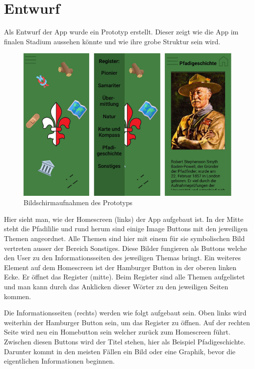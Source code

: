 \section{Entwurf}
Als Entwurf der App wurde ein Prototyp erstellt. Dieser zeigt wie die App im finalen Stadium aussehen könnte und wie ihre grobe Struktur sein wird.
\begin{figure}[h]
    \centering
    \includegraphics[width=\linewidth]{Picture/homescreen.png}
    \caption{Bildschirmaufnahmen des Prototyps}
\end{figure}
Hier sieht man, wie der Homescreen (links) der App aufgebaut ist. In der Mitte steht die Pfadililie und rund herum sind einige Image Buttons mit den jeweiligen Themen angeordnet. Alle Themen sind hier mit einem für sie symbolischen Bild vertreten ausser der Bereich Sonstiges. Diese Bilder fungieren als Buttons welche den User zu den Informationsseiten des jeweiligen Themas bringt. Ein weiteres Element auf dem Homescreen ist der Hamburger Button in der oberen linken Ecke. Er öffnet das Register (mitte). Beim Register sind alle Themen aufgelistet und man kann durch das Anklicken dieser Wörter zu den jeweiligen Seiten kommen.\par
Die Informationsseiten (rechts) werden wie folgt aufgebaut sein. Oben links wird weiterhin der Hamburger Button sein, um das Register zu öffnen. Auf der rechten Seite wird neu ein Homebutton sein welcher zurück zum Homescreen führt. Zwischen diesen Buttons wird der Titel stehen, hier als Beispiel Pfadigeschichte. Darunter kommt in den meisten Fällen ein Bild oder eine Graphik, bevor die eigentlichen Informationen beginnen.
\newpage
